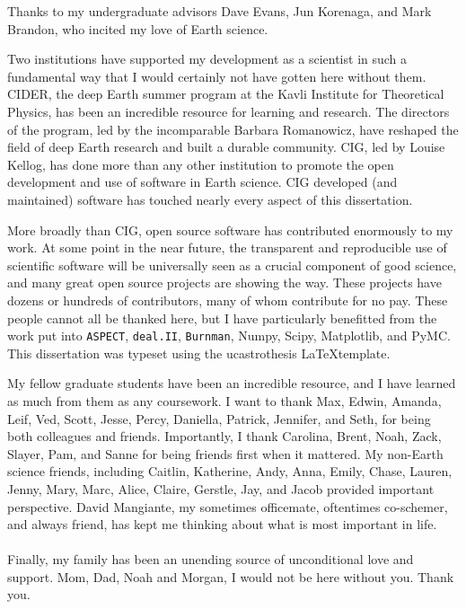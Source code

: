 \documentclass[12pt]{myucthesis}
\begin{document}
\begin{frontmatter}
\begin{acknowledgements}
Thanks to my undergraduate advisors Dave Evans, Jun Korenaga, and Mark Brandon, who
incited my love of Earth science.

Two institutions have supported my development as a scientist in such a fundamental
way that I would certainly not have gotten here without them.
CIDER, the deep Earth summer program at the Kavli Institute for Theoretical
Physics, has been an incredible resource for learning and research.
The directors of the program, led by the incomparable Barbara Romanowicz,
have reshaped the field of deep Earth research and built a durable community.
CIG, led by Louise Kellog, has done more than any other institution
to promote the open development and use of software in Earth science.
CIG developed (and maintained) software has touched nearly every aspect of this dissertation.

More broadly than CIG, open source software has contributed enormously to my work.
At some point in the near future, the transparent and reproducible use of scientific
software will be universally seen as a crucial component of good science, and many great
open source projects are showing the way. These projects have dozens or hundreds of
contributors, many of whom contribute for no pay.
These people cannot all be thanked here, but I have particularly benefitted from
the work put into \texttt{ASPECT}, \texttt{deal.II}, \texttt{Burnman},
Numpy, Scipy, Matplotlib, and PyMC.
This dissertation was typeset using the ucastrothesis \LaTeX template.

My fellow graduate students have been an incredible resource, and I
have learned as much from them as any coursework. I want to thank
Max, Edwin, Amanda, Leif, Ved, Scott, Jesse, Percy, Daniella, Patrick, Jennifer, and Seth,
for being both colleagues and friends.
Importantly, I thank Carolina, Brent, Noah, Zack, Slayer, Pam, and Sanne for being friends first when it mattered.
My non-Earth science friends, including 
Caitlin, Katherine, Andy, Anna, Emily, Chase, Lauren, Jenny, Mary, Marc, Alice, Claire, Gerstle, Jay, and Jacob
provided important perspective.
David Mangiante, my sometimes officemate, oftentimes co-schemer, and always friend, has kept me thinking about what is most important in life.
\\
\\
Finally, my family has been an unending source of unconditional love and support. 
Mom, Dad, Noah and Morgan, I would not be here without you. Thank you.

\end{acknowledgements}
\end{frontmatter}








\end{document}
